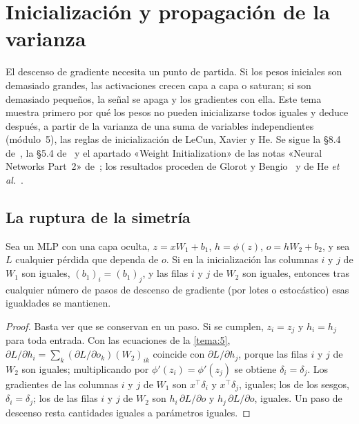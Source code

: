 \chapter{Inicialización y propagación de la varianza}
\label{tema:4}

El descenso de gradiente necesita un punto de partida. Si los pesos iniciales son demasiado grandes, las activaciones crecen capa a capa o saturan; si son demasiado pequeños, la señal se apaga y los gradientes con ella. Este tema muestra primero por qué los pesos no pueden inicializarse todos iguales y deduce después, a partir de la varianza de una suma de variables independientes (módulo~5), las reglas de inicialización de LeCun, Xavier y He. Se sigue la §8.4 de~\cite{gbc}, la §5.4 de~\cite{d2l} y el apartado «Weight Initialization» de las notas «Neural Networks Part~2» de~\cite{cs231n}; los resultados proceden de Glorot y Bengio~\cite{glorot} y de He \emph{et al.}~\cite{he}.

\section{La ruptura de la simetría}

\begin{proposicion}\label{prop:simetria}
Sea un MLP con una capa oculta, $z=xW_1+b_1$, $h=\phi(z)$, $o=hW_2+b_2$, y sea $L$ cualquier pérdida que dependa de $o$. Si en la inicialización las columnas $i$ y $j$ de $W_1$ son iguales, $(b_1)_i=(b_1)_j$, y las filas $i$ y $j$ de $W_2$ son iguales, entonces tras cualquier número de pasos de descenso de gradiente (por lotes o estocástico) esas igualdades se mantienen.
\end{proposicion}

\begin{proof}
Basta ver que se conservan en un paso. Si se cumplen, $z_i=z_j$ y $h_i=h_j$ para toda entrada. Con las ecuaciones de la \cref{tema:5}, $\partial L/\partial h_i=\sum_k(\partial L/\partial o_k)(W_2)_{ik}$ coincide con $\partial L/\partial h_j$, porque las filas $i$ y $j$ de $W_2$ son iguales; multiplicando por $\phi'(z_i)=\phi'(z_j)$ se obtiene $\delta_i=\delta_j$. Los gradientes de las columnas $i$ y $j$ de $W_1$ son $x^{\top}\delta_i$ y $x^{\top}\delta_j$, iguales; los de los sesgos, $\delta_i=\delta_j$; los de las filas $i$ y $j$ de $W_2$ son $h_i\,\partial L/\partial o$ y $h_j\,\partial L/\partial o$, iguales. Un paso de descenso resta cantidades iguales a parámetros iguales.
\end{proof}

